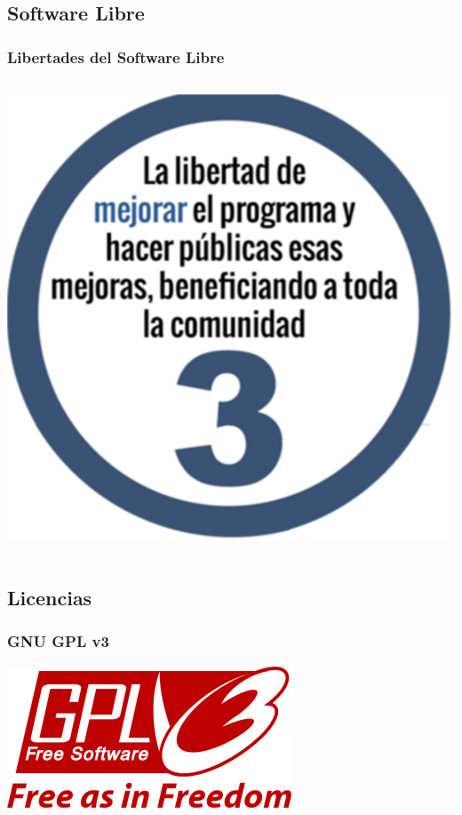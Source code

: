\subsection{Software Libre}
\begin{frame}
    \frametitle{Libertades del Software Libre}
    \begin{columns}
            \includegraphics[width=\textwidth]{Libertad-3.png}
    \end{columns}
\end{frame}

\subsection{Licencias}
\begin{frame}
    \frametitle{GNU GPL v3}
        \includegraphics[width=\textwidth]{GPLv3_Logo.png}
\end{frame}


